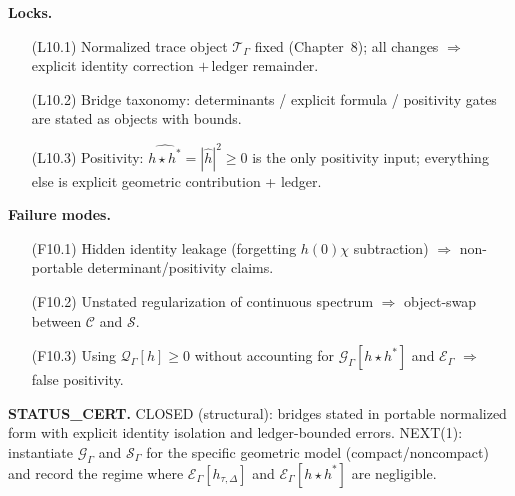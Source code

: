 \noindent\textbf{Locks.}
\begin{itemize}
\item[(L10.1)] Normalized trace object $\mathcal T_\Gamma$ fixed (Chapter~8); all changes $\Rightarrow$ explicit identity correction
$+\,$ledger remainder.
\item[(L10.2)] Bridge taxonomy: determinants / explicit formula / positivity gates are stated as objects with bounds.
\item[(L10.3)] Positivity: $\widehat{h\star h^\ast}=|\widehat h|^2\ge0$ is the only positivity input; everything else is explicit
geometric contribution + ledger.
\end{itemize}

\medskip
\noindent\textbf{Failure modes.}
\begin{itemize}
\item[(F10.1)] Hidden identity leakage (forgetting $h(0)\chi$ subtraction) $\Rightarrow$ non-portable determinant/positivity claims.
\item[(F10.2)] Unstated regularization of continuous spectrum $\Rightarrow$ object-swap between $\mathcal C$ and $\mathcal S$.
\item[(F10.3)] Using $\mathcal Q_\Gamma[h]\ge0$ without accounting for $\mathcal G_\Gamma[h\star h^\ast]$ and $\mathcal E_\Gamma$
$\Rightarrow$ false positivity.
\end{itemize}

\medskip
\noindent\textbf{STATUS\_CERT.}
CLOSED (structural): bridges stated in portable normalized form with explicit identity isolation and ledger-bounded errors.
NEXT(1): instantiate $\mathcal G_\Gamma$ and $\mathcal S_\Gamma$ for the specific geometric model (compact/noncompact) and record the
regime where $\mathcal E_\Gamma[h_{\tau,\Delta}]$ and $\mathcal E_\Gamma[h\star h^\ast]$ are negligible.

